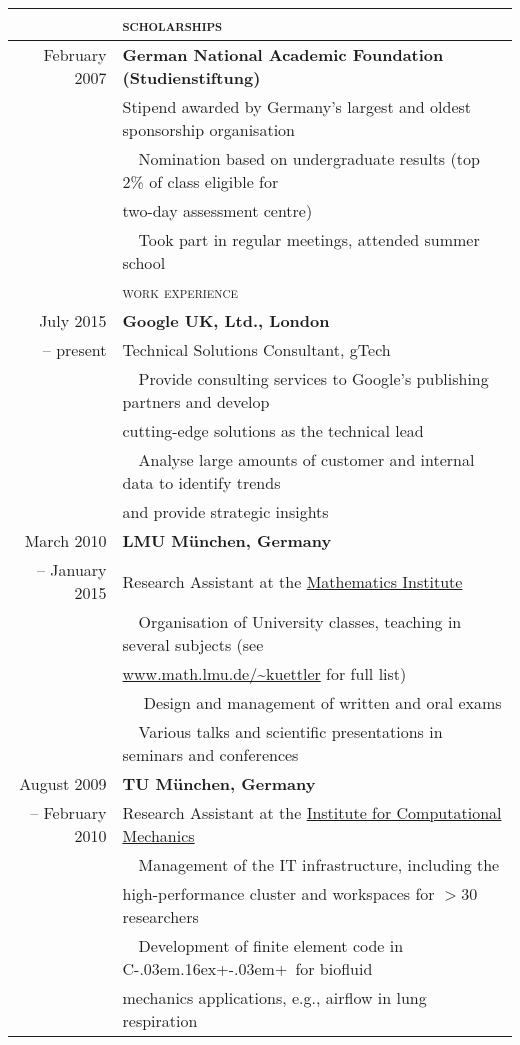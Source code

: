 \documentclass[11pt,english,a4paper]{memoir}
\newcommand{\red}{\color{Maroon}}
\newcommand{\header}[1]{%
  \addlinespace[2ex]
  & \large{\red\textsc{\MakeLowercase{#1}}} \tabularnewline
  \midrule}
\newcommand{\n}{\tabularnewline}
\newcommand{\bull}{\Pisymbol{MinionPro-Extra}{146}~~}
\newcommand{\nobull}{\phantom{\bull}}
\newcommand{\Cpp}{C\kern-.03em\raise.16ex\hbox{\small{+\kern-.03em+}}}
\begin{document}
\begin{center}
\begin{tabular}{rl}

  \n
  \header{Scholarships}
  February 2007 & \textbf{German National Academic Foundation (Studienstiftung)} \n
  & Stipend awarded by Germany's largest and oldest sponsorship organisation
  \n
  & \bull Nomination based on undergraduate results (top 2\% of class
  eligible for \\
  & \nobull two-day assessment centre) \n
  & \bull Took part in regular meetings, attended summer school

  \n
  \header{Work Experience}
  July 2015 & \textbf{Google UK, Ltd., London} \n
  -- present & Technical Solutions Consultant, gTech \n
  & \bull Provide consulting services to Google's publishing partners
  and develop \\
  & \nobull cutting-edge solutions as the technical lead \n
  & \bull Analyse large amounts of customer and internal data to
  identify trends \\
  & \nobull and provide strategic insights

  \n \addlinespace
  March 2010 & \textbf{LMU München, Germany} \n
  -- January 2015 & Research Assistant at the \href{http://www.mathematik.uni-muenchen.de/forschung/arbeitsgruppen/analysis/index.html}{Mathematics Institute} \n
  & \bull Organisation of University classes, teaching in several
  subjects
  (see \\
  & \nobull \href{http://www.math.lmu.de/~kuettler}{www.math.lmu.de/\textasciitilde{}kuettler}
  for full list)
  \\
  & \bull
  Design and management of written and oral exams \n
  & \bull Various talks and scientific presentations in seminars and
  conferences

  \n \addlinespace
  August 2009      & \textbf{TU München, Germany} \n
  -- February 2010 & Research Assistant at the \href{http://www.lnm.mw.tum.de/}{Institute for Computational Mechanics} \n
  & \bull Management of the IT infrastructure, including the \\
  & \nobull high-performance cluster and workspaces for $> 30$ researchers \\
  & \bull Development of finite element code in \Cpp\ for biofluid \\
  & \nobull mechanics applications, e.g., airflow in lung respiration


\end{tabular}
\end{center}
\end{document}

